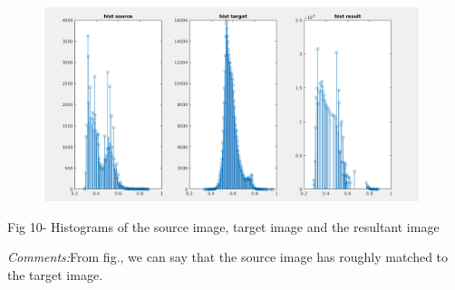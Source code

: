 \documentclass[12pt]{article}
\begin{document}

\begin{figure}[H]
	\begin{Center}
		\includegraphics[width=4.32in,height=2.23in]{./media/image14.png}
	\end{Center}
\end{figure}



\par

\begin{Center}
Fig 10- Histograms of the source image, target image and the resultant image
\end{Center}\par


\vspace{\baselineskip}
\begin{adjustwidth}{1.0in}{0.0in}
\begin{justify}
\textit{Comments:}From fig., we can say that the source image has roughly matched to the target image.
\end{justify}\par

\end{adjustwidth}


\vspace{\baselineskip}

\vspace{\baselineskip}

\vspace{\baselineskip}

\vspace{\baselineskip}

\vspace{\baselineskip}

\vspace{\baselineskip}
\end{document}
